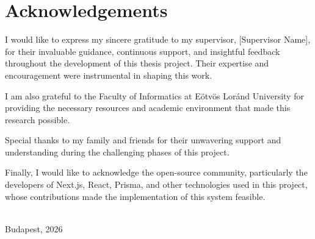 \chapter*{Acknowledgements}

I would like to express my sincere gratitude to my supervisor, [Supervisor Name], for their invaluable guidance, continuous support, and insightful feedback throughout the development of this thesis project. Their expertise and encouragement were instrumental in shaping this work.

I am also grateful to the Faculty of Informatics at Eötvös Loránd University for providing the necessary resources and academic environment that made this research possible.

Special thanks to my family and friends for their unwavering support and understanding during the challenging phases of this project.

Finally, I would like to acknowledge the open-source community, particularly the developers of Next.js, React, Prisma, and other technologies used in this project, whose contributions made the implementation of this system feasible.

\vspace{1cm}

\begin{flushright}
\\
Budapest, 2026
\end{flushright}

\newpage
